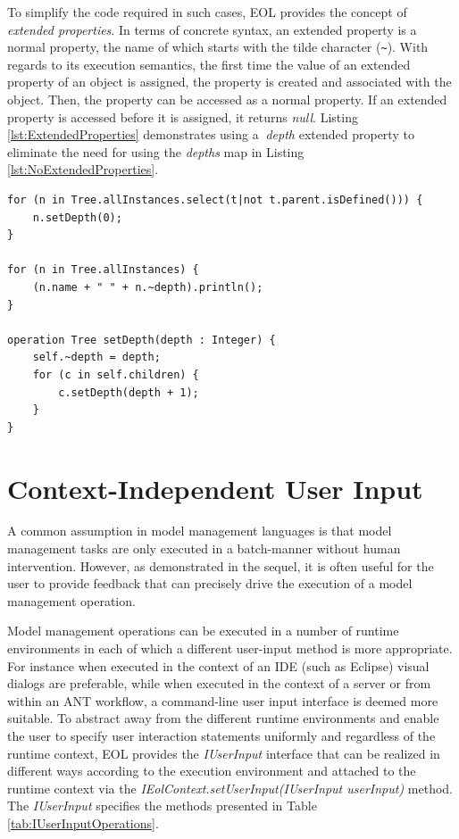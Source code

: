 To simplify the code required in such cases, EOL provides the concept of \emph{extended properties}. In terms of concrete syntax, an extended property is a normal property, the name of which starts with the tilde character (\verb|~|). With regards to its execution semantics, the first time the value of an extended property of an object is assigned, the property is created and associated with the object. Then, the property can be accessed as a normal property. If an extended property is accessed before it is assigned, it returns \emph{null}. Listing \ref{lst:ExtendedProperties} demonstrates using a $~$\emph{depth} extended property to eliminate the need for using the \emph{depths} map in Listing \ref{lst:NoExtendedProperties}.

\begin{lstlisting}[float=tbp, caption=A simplified version of Listing \ref{lst:NoExtendedProperties} using extended properties, label=lst:ExtendedProperties, language=EOL]
for (n in Tree.allInstances.select(t|not t.parent.isDefined())) {
	n.setDepth(0);
}

for (n in Tree.allInstances) {
	(n.name + " " + n.~depth).println();
}

operation Tree setDepth(depth : Integer) {
	self.~depth = depth;
	for (c in self.children) {
		c.setDepth(depth + 1);
	}
}
\end{lstlisting}


\section{Context-Independent User Input}
\label{sec:Design.EOL.UserInput}

A common assumption in model management languages is that model management tasks are only executed in a batch-manner without human intervention. However, as demonstrated in the sequel, it is often useful for the user to provide feedback that can precisely drive the execution of a model management operation.

Model management operations can be executed in a number of runtime environments in each of which a different user-input method is more appropriate. For instance when executed in the context of an IDE (such as Eclipse) visual dialogs are preferable, while when executed in the context of a server or from within an ANT workflow, a command-line user input interface is deemed more suitable. To abstract away from the different runtime environments and enable the user to specify user interaction statements uniformly and regardless of the runtime context, EOL provides the \emph{IUserInput} interface that can be realized in different ways according to the execution environment and attached to the runtime context via the \emph{IEolContext.setUserInput(IUserInput userInput)} method. The \emph{IUserInput} specifies the methods presented in Table \ref{tab:IUserInputOperations}.

